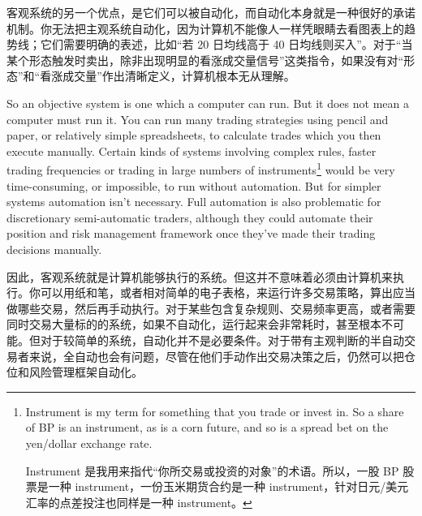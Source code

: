 \begin{chineseblock}客观系统的另一个优点，是它们可以被自动化，而自动化本身就是一种很好的承诺机制。你无法把主观系统自动化，因为计算机不能像人一样凭眼睛去看图表上的趋势线；它们需要明确的表述，比如“若 20 日均线高于 40 日均线则买入”。对于“当某个形态触发时卖出，除非出现明显的看涨成交量信号”这类指令，如果没有对“形态”和“看涨成交量”作出清晰定义，计算机根本无从理解。\end{chineseblock}

\bipairgap

\begin{englishblock} So an objective system is one which a computer can run. But it does not mean a computer must run it. You can run many trading strategies using pencil and paper, or relatively simple spreadsheets, to calculate trades which you then execute manually. Certain kinds of systems involving complex rules, faster trading frequencies or trading in large numbers of instruments\footnote{Instrument is my term for something that you trade or invest in. So a share of BP is an instrument, as is a corn future, and so is a spread bet on the yen/dollar exchange rate. \par Instrument 是我用来指代“你所交易或投资的对象”的术语。所以，一股 BP 股票是一种 instrument，一份玉米期货合约是一种 instrument，针对日元/美元汇率的点差投注也同样是一种 instrument。} would be very time-consuming, or impossible, to run without automation. But for simpler systems automation isn't necessary. Full automation is also problematic for discretionary semi-automatic traders, although they could automate their position and risk management framework once they've made their trading decisions manually. \end{englishblock}

\begin{chineseblock}因此，客观系统就是计算机能够执行的系统。但这并不意味着必须由计算机来执行。你可以用纸和笔，或者相对简单的电子表格，来运行许多交易策略，算出应当做哪些交易，然后再手动执行。对于某些包含复杂规则、交易频率更高，或者需要同时交易大量标的的系统，如果不自动化，运行起来会非常耗时，甚至根本不可能。但对于较简单的系统，自动化并不是必要条件。对于带有主观判断的半自动交易者来说，全自动也会有问题，尽管在他们手动作出交易决策之后，仍然可以把仓位和风险管理框架自动化。\end{chineseblock}

\bipairgap

